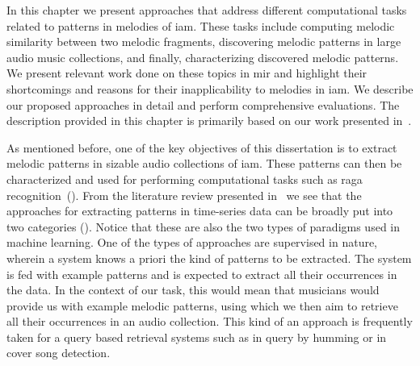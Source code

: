 
In this chapter we present approaches that address different computational tasks related to patterns in melodies of \gls{iam}. These tasks include computing melodic similarity between two melodic fragments, discovering melodic patterns in large audio music collections, and finally, characterizing discovered melodic patterns. We present relevant work done on these topics in \gls{mir} and highlight their shortcomings and reasons for their inapplicability to melodies in \gls{iam}. We describe our proposed approaches in detail and perform comprehensive evaluations. The description provided in this chapter is primarily based on our work presented in~\cite{gulati_SITIS_2014,gulati_ICASSP2015, gulati_ISMIR_2015,gulati_communities_2016}.

As mentioned before, one of the key objectives of this dissertation is to extract melodic patterns in sizable audio collections of \gls{iam}. These patterns can then be characterized and used for performing computational tasks such as \gls{raga} recognition~(). From the literature review presented in~ we see that the approaches for extracting patterns in time-series data can be broadly put into two categories (). Notice that these are also the two types of paradigms used in machine learning. One of the types of approaches are supervised in nature, wherein a system knows a priori the kind of patterns to be extracted. The system is fed with example patterns and is expected to extract all their occurrences in the data. In the context of our task, this would mean that musicians would provide us with example melodic patterns, using which we then aim to retrieve all their occurrences in an audio collection. This kind of an approach is frequently taken for a query based retrieval systems such as in query by humming or in cover song detection. 


